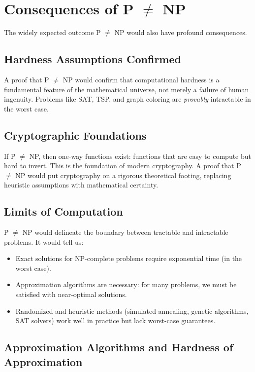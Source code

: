 \section{Consequences of P $\neq$ NP}

The widely expected outcome P $\neq$ NP would also have profound consequences.

\subsection{Hardness Assumptions Confirmed}

A proof that P $\neq$ NP would confirm that computational hardness is a fundamental feature of the mathematical universe, not merely a failure of human ingenuity. Problems like SAT, TSP, and graph coloring are \emph{provably} intractable in the worst case.

\subsection{Cryptographic Foundations}

If P $\neq$ NP, then one-way functions exist: functions that are easy to compute but hard to invert. This is the foundation of modern cryptography. A proof that P $\neq$ NP would put cryptography on a rigorous theoretical footing, replacing heuristic assumptions with mathematical certainty.

\subsection{Limits of Computation}

P $\neq$ NP would delineate the boundary between tractable and intractable problems. It would tell us:
\begin{itemize}
  \item Exact solutions for NP-complete problems require exponential time (in the worst case).
  \item Approximation algorithms are necessary: for many problems, we must be satisfied with near-optimal solutions.
  \item Randomized and heuristic methods (simulated annealing, genetic algorithms, SAT solvers) work well in practice but lack worst-case guarantees.
\end{itemize}

\subsection{Approximation Algorithms and Hardness of Approximation}

